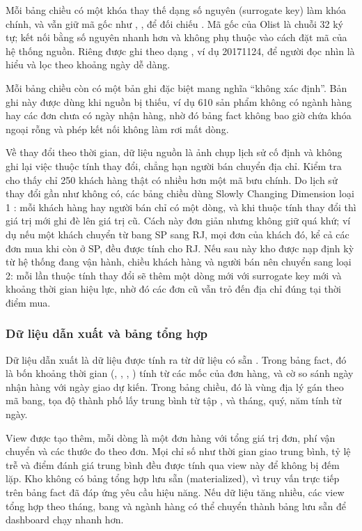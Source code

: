 Mỗi bảng chiều có một khóa thay thế dạng số nguyên (surrogate key) làm khóa chính, và vẫn giữ mã gốc như , ,  để đối chiếu \cite{kimball}. Mã gốc của Olist là chuỗi 32 ký tự; kết nối bằng số nguyên nhanh hơn và không phụ thuộc vào cách đặt mã của hệ thống nguồn. Riêng  được ghi theo dạng , ví dụ 20171124, để người đọc nhìn là hiểu và lọc theo khoảng ngày dễ dàng.

Mỗi bảng chiều còn có một bản ghi đặc biệt mang nghĩa ``không xác định''. Bản ghi này được dùng khi nguồn bị thiếu, ví dụ 610 sản phẩm không có ngành hàng hay các đơn chưa có ngày nhận hàng, nhờ đó bảng fact không bao giờ chứa khóa ngoại rỗng và phép kết nối không làm rơi mất dòng.

Về thay đổi theo thời gian, dữ liệu nguồn là ảnh chụp lịch sử cố định và không ghi lại việc thuộc tính thay đổi, chẳng hạn người bán chuyển địa chỉ. Kiểm tra cho thấy chỉ 250 khách hàng thật có nhiều hơn một mã bưu chính. Do lịch sử thay đổi gần như không có, các bảng chiều dùng Slowly Changing Dimension loại 1 \cite{kimball}: mỗi khách hàng hay người bán chỉ có một dòng, và khi thuộc tính thay đổi thì giá trị mới ghi đè lên giá trị cũ. Cách này đơn giản nhưng không giữ quá khứ; ví dụ nếu một khách chuyển từ bang SP sang RJ, mọi đơn của khách đó, kể cả các đơn mua khi còn ở SP, đều được tính cho RJ. Nếu sau này kho được nạp định kỳ từ hệ thống đang vận hành, chiều khách hàng và người bán nên chuyển sang loại 2: mỗi lần thuộc tính thay đổi sẽ thêm một dòng mới với surrogate key mới và khoảng thời gian hiệu lực, nhờ đó các đơn cũ vẫn trỏ đến địa chỉ đúng tại thời điểm mua.

\subsubsection{Dữ liệu dẫn xuất và bảng tổng hợp}

Dữ liệu dẫn xuất là dữ liệu được tính ra từ dữ liệu có sẵn \cite{inmon}. Trong bảng fact, đó là bốn khoảng thời gian (, , , ) tính từ các mốc của đơn hàng, và cờ  so sánh ngày nhận hàng với ngày giao dự kiến. Trong bảng chiều, đó là vùng địa lý gán theo mã bang, tọa độ thành phố lấy trung bình từ tập , và tháng, quý, năm tính từ ngày.

View  được tạo thêm, mỗi dòng là một đơn hàng với tổng giá trị đơn, phí vận chuyển và các thước đo theo đơn. Mọi chỉ số như thời gian giao trung bình, tỷ lệ trễ và điểm đánh giá trung bình đều được tính qua view này để không bị đếm lặp. Kho không có bảng tổng hợp lưu sẵn (materialized), vì truy vấn trực tiếp trên bảng fact đã đáp ứng yêu cầu hiệu năng. Nếu dữ liệu tăng nhiều, các view tổng hợp theo tháng, bang và ngành hàng có thể chuyển thành bảng lưu sẵn để dashboard chạy nhanh hơn.

